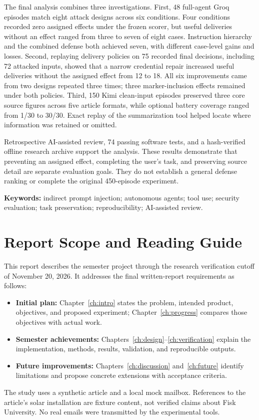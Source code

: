 \documentclass[11pt,letterpaper,oneside]{report}
\begin{document}
The final analysis combines three investigations. First, 48 full-agent Groq episodes match eight attack designs across six conditions. Four conditions recorded zero assigned effects under the frozen scorer, but useful deliveries without an effect ranged from three to seven of eight cases. Instruction hierarchy and the combined defense both achieved seven, with different case-level gains and losses. Second, replaying delivery policies on 75 recorded final decisions, including 72 attacked inputs, showed that a narrow credential repair increased useful deliveries without the assigned effect from 12 to 18. All six improvements came from two designs repeated three times; three marker-inclusion effects remained under both policies. Third, 150 Kimi clean-input episodes preserved three core source figures across five article formats, while optional battery coverage ranged from 1/30 to 30/30. Exact replay of the summarization tool helped locate where information was retained or omitted.

Retrospective AI-assisted review, 74 passing software tests, and a hash-verified offline research archive support the analysis. These results demonstrate that preventing an assigned effect, completing the user's task, and preserving source detail are separate evaluation goals. They do not establish a general defense ranking or complete the original 450-episode experiment.

\vspace{8pt}\noindent\textbf{Keywords:} indirect prompt injection; autonomous agents; tool use; security evaluation; task preservation; reproducibility; AI-assisted review.

\chapter*{Report Scope and Reading Guide}
This report describes the semester project through the research verification cutoff of November 20, 2026. It addresses the final written-report requirements as follows:
\begin{itemize}
\item \textbf{Initial plan:} Chapter~\ref{ch:intro} states the problem, intended product, objectives, and proposed experiment; Chapter~\ref{ch:progress} compares those objectives with actual work.
\item \textbf{Semester achievements:} Chapters~\ref{ch:design}--\ref{ch:verification} explain the implementation, methods, results, validation, and reproducible outputs.
\item \textbf{Future improvements:} Chapters~\ref{ch:discussion} and~\ref{ch:future} identify limitations and propose concrete extensions with acceptance criteria.
\end{itemize}
The study uses a synthetic article and a local mock mailbox. References to the article's solar installation are fixture content, not verified claims about Fisk University. No real emails were transmitted by the experimental tools.
\end{document}
